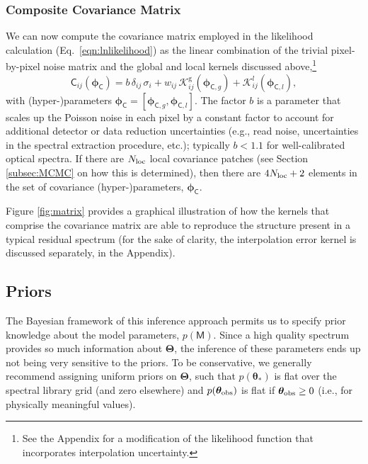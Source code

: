 \documentclass[iop,floatfix,numberedappendix,twocolappendix]{emulateapj}
\newcommand{\vM}{\mathsf{M}}
\newcommand{\vC}{\mathsf{C}}
\newcommand{\vt}{ {\bm \theta}}
\newcommand{\vT}{ {\bm \Theta}}
\newcommand{\vp}{ {\bm \phi}}
\newcommand{\cov}{ \vp_{\mathsf{C}}}
\newcommand{\KK}{\mathcal{K}}
\newcommand{\Kglobal}{\KK^{\textrm{g}}}
\newcommand{\Klocal}{\KK^l}
\begin{document}
\subsubsection{Composite Covariance Matrix}

We can now compute the covariance matrix employed in the likelihood calculation 
(Eq.~\ref{eqn:lnlikelihood}) as the linear combination of the trivial pixel-by-pixel noise matrix 
and the global and local kernels discussed above,\footnote{See the Appendix for a modification of 
the likelihood function that incorporates interpolation uncertainty.} 
\begin{equation}
\vC_{ij}(\cov)  = b \, \delta_{ij} \, \sigma_i + w_{ij} \, \Kglobal_{ij}(\vp_{{\mathsf C}, g}) + 
                  \Klocal_{ij}(\vp_{{\mathsf C}, l}), 
\end{equation}
with (hyper-)parameters $\cov = [\vp_{{\mathsf C}, g}, \vp_{{\mathsf C}, l}]$.  The factor $b$ is 
a parameter that scales up the Poisson noise in each pixel by a constant factor to account for 
additional detector or data reduction uncertainties (e.g., read noise, uncertainties in the 
spectral extraction procedure, etc.); typically $b < 1.1$ for well-calibrated optical spectra.  If 
there are $N_{\rm loc}$ local covariance patches (see Section \ref{subsec:MCMC} on how this is 
determined), then there are $4N_{\rm loc}+2$ elements in the set of covariance (hyper-)parameters, 
$\cov$.  

Figure \ref{fig:matrix} provides a graphical illustration of how the kernels that comprise the 
covariance matrix are able to reproduce the structure present in a typical residual spectrum (for 
the sake of clarity, the interpolation error kernel is discussed separately, in the Appendix).  


\subsection{Priors} \label{subsec:priors}

The Bayesian framework of this inference approach permits us to specify prior knowledge about the 
model parameters, $p(\vM)$.  Since a high quality spectrum provides so much information about 
$\vT$, the inference of these parameters ends up not being very sensitive to the priors.  To be 
conservative, we generally recommend assigning uniform priors on $\vT$, such that $p(\vt_{\ast})$
is flat over the spectral library grid (and zero elsewhere) and $p(\vt_{\rm obs})$ is flat if 
$\vt_{\rm obs} \ge 0$ (i.e., for physically meaningful values).  
\end{document}
